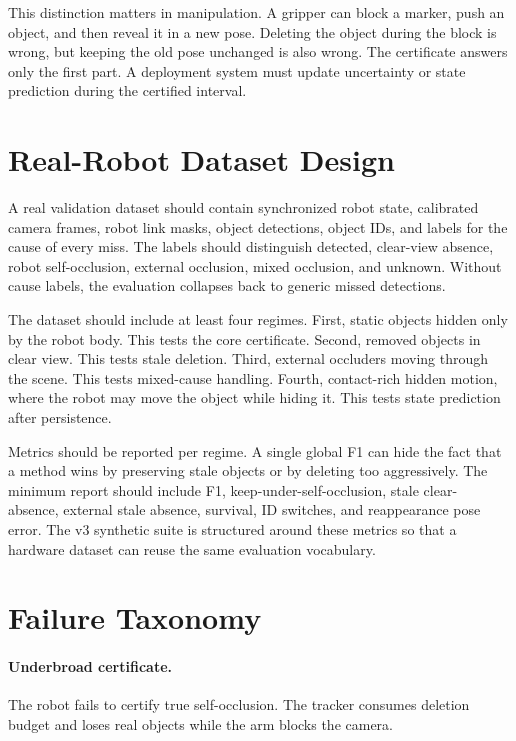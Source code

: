 \documentclass{article}
\begin{document}
This distinction matters in manipulation. A gripper can block a marker, push an
object, and then reveal it in a new pose. Deleting the object during the block
is wrong, but keeping the old pose unchanged is also wrong. The certificate
answers only the first part. A deployment system must update uncertainty or
state prediction during the certified interval.

\section{Real-Robot Dataset Design}

A real validation dataset should contain synchronized robot state, calibrated
camera frames, robot link masks, object detections, object IDs, and labels for
the cause of every miss. The labels should distinguish detected, clear-view
absence, robot self-occlusion, external occlusion, mixed occlusion, and unknown.
Without cause labels, the evaluation collapses back to generic missed
detections.

The dataset should include at least four regimes. First, static objects hidden
only by the robot body. This tests the core certificate. Second, removed
objects in clear view. This tests stale deletion. Third, external occluders
moving through the scene. This tests mixed-cause handling. Fourth, contact-rich
hidden motion, where the robot may move the object while hiding it. This tests
state prediction after persistence.

Metrics should be reported per regime. A single global F1 can hide the fact that
a method wins by preserving stale objects or by deleting too aggressively. The
minimum report should include F1, keep-under-self-occlusion, stale clear-
absence, external stale absence, survival, ID switches, and reappearance pose
error. The v3 synthetic suite is structured around these metrics so that a
hardware dataset can reuse the same evaluation vocabulary.

\section{Failure Taxonomy}

\paragraph{Underbroad certificate.}
The robot fails to certify true self-occlusion. The tracker consumes deletion
budget and loses real objects while the arm blocks the camera.
\end{document}
